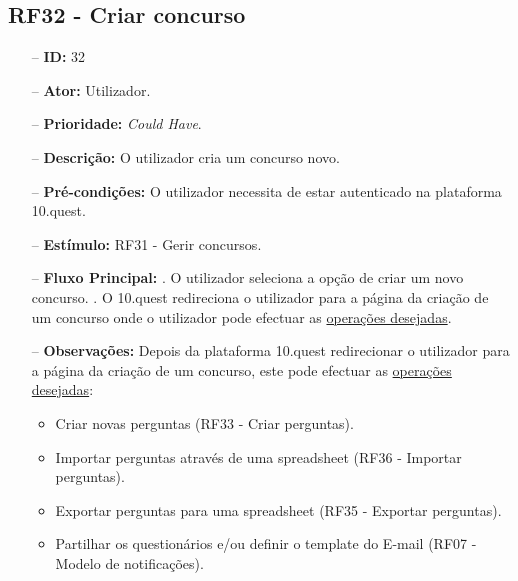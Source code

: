 \subsection{RF32 - Criar concurso}
\begin{itemize}
	\item[--] \textbf{ID:} 32
	\item[--]  \textbf{Ator:} Utilizador.
	\item[--]  \textbf{Prioridade:} \textit{Could Have}.
	\item[--]  \textbf{Descrição:} O utilizador cria um concurso novo.
	\item[--]  \textbf{Pré-condições:} O utilizador necessita de estar autenticado na plataforma 10.quest.
	\item[--]  \textbf{Estímulo:} RF31 - Gerir concursos.
	\item[--]  \textbf{Fluxo Principal:} 
	. O utilizador seleciona a opção de criar um novo concurso.
	. O 10.quest redireciona o utilizador para a página da criação de um concurso onde o utilizador pode efectuar as \underline{operações desejadas}.
	\item[--]  \textbf{Observações:} Depois da plataforma 10.quest redirecionar o utilizador para a página da criação de um concurso, este pode efectuar as \underline{operações desejadas}:
	\begin{itemize}
		\item Criar novas perguntas (RF33 - Criar perguntas).
		\item Importar perguntas através de uma spreadsheet (RF36 - Importar perguntas).
		\item Exportar perguntas para uma spreadsheet (RF35 - Exportar perguntas).
		\item Partilhar os questionários e/ou definir o template do E-mail (RF07 - Modelo de notificações).
	\end{itemize}
\end{itemize}
\newpage

